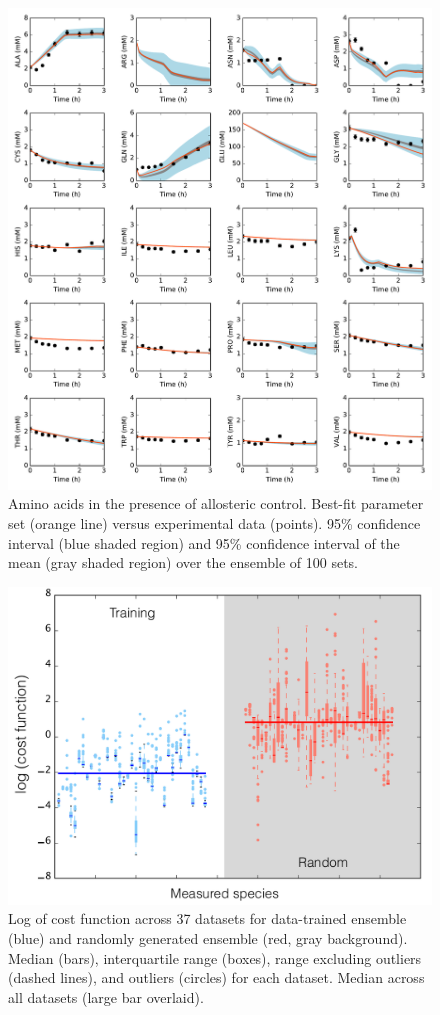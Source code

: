 \documentclass[12pt]{article}
\begin{document}
\begin{figure}[ht]
\centering
\includegraphics[width=1.00\textwidth]{./Figures/Amino.pdf}
\caption{Amino acids in the presence of allosteric control. Best-fit parameter set (orange line) versus experimental data (points). 95\% confidence interval (blue shaded region) and 95\% confidence interval of the mean (gray shaded region) over the ensemble of 100 sets.}
\label{fig:Amino}
\end{figure}

\begin{figure}[ht]
\centering
\includegraphics[width=1.00\textwidth]{./Figures/BoxPlot-KCFM.pdf}
\caption{Log of cost function across 37 datasets for data-trained ensemble (blue) and randomly generated ensemble (red, gray background). Median (bars), interquartile range (boxes), range excluding outliers (dashed lines), and outliers (circles) for each dataset. Median across all datasets (large bar overlaid).}
\label{fig:BoxPlot}
\end{figure}
\end{document}
